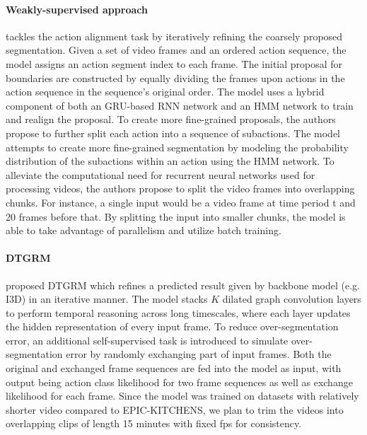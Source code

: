 \paragraph{Weakly-supervised approach}
 tackles the action alignment task by iteratively refining the coarsely proposed segmentation. Given a set of video frames and an ordered action sequence, the model assigns an action segment index to each frame. The initial proposal for boundaries are constructed by equally dividing the frames upon actions in the action sequence in the sequence's original order. The model uses a hybrid component of both an GRU-based RNN network and an HMM network to train and realign the proposal. To create more fine-grained proposals, the authors propose to further split each action into a sequence of subactions. The model attempts to create more fine-grained segmentation by modeling the probability distribution of the subactions within an action using the HMM network. To alleviate the computational need for recurrent neural networks used for processing videos, the authors propose to split the video frames into overlapping chunks. For instance, a single input would be a video frame at time period t and 20 frames before that. By splitting the input into smaller chunks, the model is able to take advantage of parallelism and utilize batch training.

\paragraph{DTGRM}

 proposed DTGRM which refines a predicted result given by backbone model (e.g. I3D) in an iterative manner. The model stacks $K$ dilated graph convolution layers to perform temporal reasoning across long timescales, where each layer updates the hidden representation of every input frame. To reduce over-segmentation error, an additional self-supervised task is introduced to simulate over-segmentation error by randomly exchanging part of input frames. Both the original and exchanged frame sequences are fed into the model as input, with output being action class likelihood for two frame sequences as well as exchange likelihood for each frame. Since the model was trained on datasets with relatively shorter video compared to EPIC-KITCHENS, we plan to trim the videos into overlapping clips of length 15 minutes with fixed fps for consistency.
